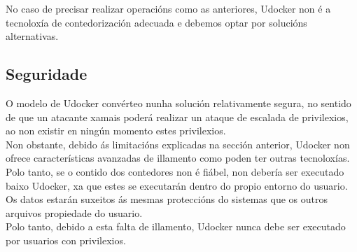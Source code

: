 No caso de precisar realizar operacións como as anteriores, Udocker non é a tecnoloxía de contedorización adecuada e debemos optar por solucións alternativas. \cite{UdockerDoc}

\subsection{Seguridade}

O modelo de Udocker convérteo nunha solución relativamente segura, no sentido de que un atacante xamais poderá realizar un ataque de escalada de privilexios, ao non existir en ningún momento estes privilexios.\\

Non obstante, debido ás limitacións explicadas na sección anterior, Udocker non ofrece características avanzadas de illamento como poden ter outras tecnoloxías. Polo tanto, se o contido dos contedores non é fiábel, non debería ser executado baixo Udocker, xa que estes se executarán dentro do propio entorno do usuario. Os datos estarán suxeitos ás mesmas proteccións do sistemas que os outros arquivos propiedade do usuario.\\

Polo tanto, debido a esta falta de illamento, Udocker nunca debe ser executado por usuarios con privilexios.\\

